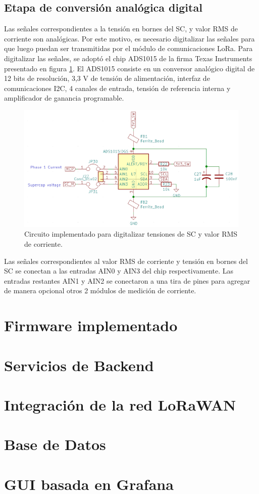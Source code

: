 \subsection{Etapa de conversión analógica digital}
Las señales correspondientes a la tensión en bornes del SC, y valor RMS de corriente son analógicas. Por este motivo, es necesario digitalizar las señales para que luego puedan ser transmitidas por el módulo de comunicaciones LoRa. Para digitalizar las señales, se adoptó el chip ADS1015 de la firma Texas Instruments presentado en figura \ref{fig:ctoadc}. El ADS1015 consiste en un conversor analógico digital de 12 bits de resolución, 3,3 V de tensión de alimentación, interfaz de comunicaciones I2C, 4 canales de entrada, tensión de referencia interna y amplificador de ganancia programable.\\
\begin{figure}[h!]
	\centering
	\includegraphics[width=0.7\linewidth]{Figures/cto_adc}
	\caption{Circuito implementado para digitalizar tensiones de SC y valor RMS de corriente.}
	\label{fig:ctoadc}
\end{figure}
Las señales correspondientes al valor RMS de corriente y tensión en bornes del SC se conectan a las entradas AIN0 y AIN3 del chip respectivamente. Las entradas restantes AIN1 y AIN2 se conectaron a una tira de pines para agregar de manera opcional otros 2 módulos de medición de corriente.\\


\section{Firmware implementado}
\label{seccion_firmware}

\section{Servicios de Backend}
\label{seccion_bes}

\section{Integraci\'{o}n de la red LoRaWAN}

\section{Base de Datos}

\section{GUI basada en Grafana}

